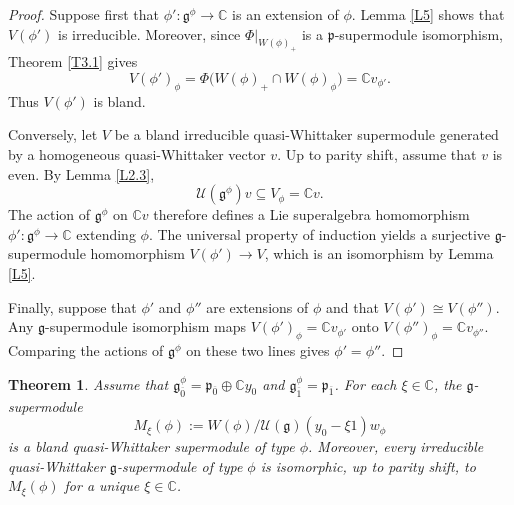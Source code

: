 \documentclass[12pt,reqno]{article}
\newtheorem{thm}{Theorem}[section]
\def\o{\overline}
\def\F{\mathfrak}
\def\C{\mathcal}
\def\CC{\mathbb{C}}
\def\beqn{\begin{equation*}}
\def\eeqn{\end{equation*}}
\def\beq{\begin{equation}}
\def\eeq{\end{equation}}
\begin{document}
\begin{proof}
Suppose first that $\phi'\colon\F{g}^\phi\rightarrow\CC$ is an extension of $\phi$. Lemma \ref{L5} shows that $V(\phi')$ is irreducible. Moreover, since $\Phi|_{W(\phi)_+}$ is a $\F{p}$-supermodule isomorphism, Theorem \ref{T3.1} gives
\beqn
V(\phi')_\phi=\Phi\bigl(W(\phi)_+\cap W(\phi)_\phi\bigr)=\CC v_{\phi'}.
\eeqn
Thus $V(\phi')$ is bland.

Conversely, let $V$ be a bland irreducible quasi-Whittaker supermodule generated by a homogeneous quasi-Whittaker vector $v$. Up to parity shift, assume that $v$ is even. By Lemma \ref{L2.3},
\beqn
\C{U}(\F{g}^\phi)v\subseteq V_\phi=\CC v.
\eeqn
The action of $\F{g}^\phi$ on $\CC v$ therefore defines a Lie superalgebra homomorphism $\phi'\colon\F{g}^\phi\rightarrow\CC$ extending $\phi$. The universal property of induction yields a surjective $\F{g}$-supermodule homomorphism $V(\phi')\rightarrow V$, which is an isomorphism by Lemma \ref{L5}.

Finally, suppose that $\phi'$ and $\phi''$ are extensions of $\phi$ and that $V(\phi')\cong V(\phi'')$. Any $\F{g}$-supermodule isomorphism maps $V(\phi')_\phi=\CC v_{\phi'}$ onto $V(\phi'')_\phi=\CC v_{\phi''}$. Comparing the actions of $\F{g}^\phi$ on these two lines gives $\phi'=\phi''$.
\end{proof}





\begin{thm}\label{T3.7}
Assume that $\F{g}^\phi_{\o{0}}=\F{p}_{\o{0}}\oplus\CC y_0$ and $\F{g}_{\o{1}}^\phi=\F{p}_{\o{1}}$. For each $\xi\in\CC$, the $\F{g}$-supermodule
\beq
M_\xi(\phi):=W(\phi)/\C{U}(\F{g})(y_0-\xi1)w_\phi
\eeq
is a bland quasi-Whittaker supermodule of type $\phi$. Moreover, every irreducible quasi-Whittaker $\F{g}$-supermodule of type $\phi$ is isomorphic, up to parity shift, to $M_\xi(\phi)$ for a unique $\xi\in\CC$.
 \end{thm}
\end{document}
